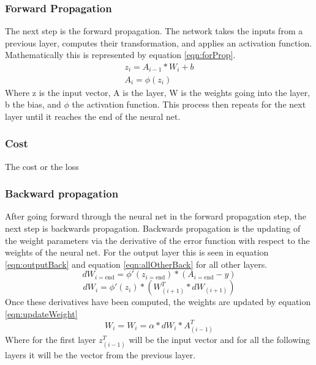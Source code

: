 \documentclass[12pt]{article}
\begin{document}
	\subsubsection{Forward Propagation}
	The next step is the forward propagation. The network takes the inputs from a previous layer, computes their transformation, and applies an activation function. Mathematically this is represented by equation \ref{eqn:forProp}. 
	\begin{equation}
	\begin{aligned}
	z_i = A_{i-1}* W_{i}+b\\
	A_i=\phi(z_i)
	\end{aligned}
	\label{eqn:forProp}
	\end{equation}
	Where z is the input vector, A is the layer, W is the weights going into the layer, b the bias, and $\phi$ the activation function. This process then repeats for the next layer until it reaches the end of the neural net.
	
	\subsubsection{Cost}
	The cost or the loss

	\subsubsection{Backward propagation}
	
	After going forward through the neural net in the forward propagation step, the next step is backwards propagation. Backwards propagation is the updating of the weight parameters via the derivative of the error function with respect to the weights of the neural net. For the output layer this is seen in equation \ref{eqn:outputBack} and equation \ref{eqn:allOtherBack} for all other layers.
	\begin{equation}
	dW_{i=\text{end}}=\phi'(z_{i=\text{end}})*\left(A_{i=\text{end}}-y\right)
	\label{eqn:outputBack}
	\end{equation}
	\begin{equation}
	dW_i=\phi'(z_i)*\left(W_{\left(i+1\right)}^T*dW_{\left(i+1\right)}\right)
	\label{eqn:allOtherBack}
	\end{equation}
	Once these derivatives have been computed, the weights are updated by equation \ref{eqn:updateWeight}
	\begin{equation}
	W_i = W_i=\alpha*dW_{i}*A_{\left(i-1\right)}^T
	\label{eqn:updateWeight}
	\end{equation}
	Where for the first layer $z_{\left(i-1\right)}^T$ will be the input vector and for all the following layers it will be the vector from the previous layer. 
\end{document}
